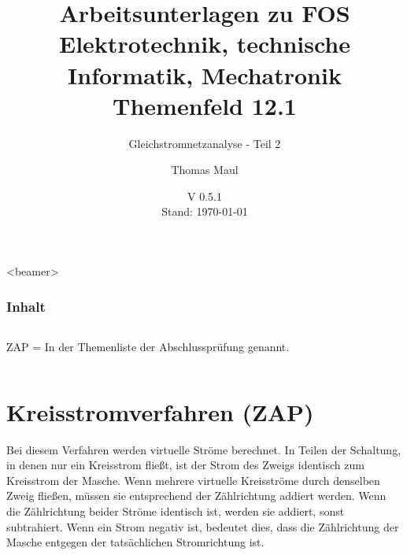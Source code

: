 \documentclass[aspectratio=169, ignorenonframetext]{beamer}
\title{Arbeitsunterlagen zu FOS Elektrotechnik, technische Informatik, Mechatronik Themenfeld 12.1}
\subtitle{Gleichstromnetzanalyse - Teil 2}
\date{V 0.5.1 \\ Stand: \today}%
\institute[BWS Hofheim]{Brühlwiesenschule, Hofheim}
\author{Thomas Maul}
\begin{document}


\begin{frame}<beamer>
  \frametitle{Inhalt}
  \begin{columns}
    \tableofcontents[sections={1-4},hidesubsections]%
    ZAP = In der Themenliste der Abschlussprüfung genannt.
    \tableofcontents[sections={5-},hidesubsections]%
  \end{columns}
\end{frame}
\section[MaschenV]{Kreisstromverfahren (ZAP)}
Bei diesem Verfahren werden virtuelle Ströme berechnet. In Teilen der Schaltung, in denen nur ein Kreisstrom fließt, ist der Strom des Zweigs identisch zum Kreisstrom der Masche. Wenn mehrere virtuelle Kreisströme durch denselben Zweig fließen, müssen sie entsprechend der Zählrichtung addiert werden. Wenn die Zählrichtung beider Ströme identisch ist, werden sie addiert, sonst subtrahiert. Wenn ein Strom negativ ist, bedeutet dies, dass die Zählrichtung der Masche entgegen der tatsächlichen Stromrichtung ist.
\end{document}
